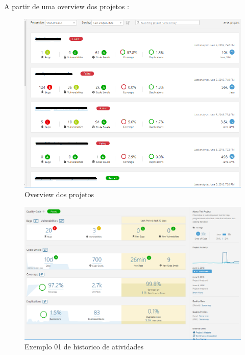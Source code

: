\documentclass[12pt]{article}
\begin{document}
A partir de uma overview dos projetos :
\begin{figure}[H]
	\centering
		\includegraphics[scale=0.5]{img/sonar-overview.png}
	\caption{Overview dos projetos}
	\label{fig:sonar-overview}
\end{figure}

\begin{figure}[H]
	\centering
		\includegraphics[scale=0.5]{img/sonar-overview-checkstyle.png}
	\caption{Exemplo 01 de historico de atividades}
	\label{fig:sonar-overview-checkstyle}
\end{figure}
\end{document}
